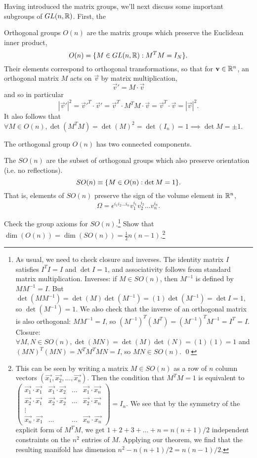 Having introduced the matrix groups, we'll next discuss some important subgroups of $GL(n,\mathbb{R})$. First, the 
\begin{defn}
Orthogonal groups $O(n)$ are the matrix groups which preserve the Euclidean inner product,
\begin{equation}
O(n)=\{M\in GL(n,\mathbb{R}): M^T M = I_N\}.
\end{equation}
Their elements correspond to orthogonal transformations, so that for $\boldsymbol{\mathbf{v}}\in \mathbb{R}^n$, an orthogonal matrix $M$ acts on $\vec{v}$ by matrix multiplication,
$$\vec{v}'=M\cdot \vec{v}$$
and so in particular
$$|\vec{v}'|^2={\vec{v}'}^T \cdot \vec{v}' = \vec{v}^T \cdot M^T M \cdot \vec{v}= \vec{v}^T \cdot \vec{v}=|\vec{v}|^2.$$
It also follows that $\forall M\in O(n), \det(M^TM)=\det(M)^2 = \det(I_n) = 1 \implies \det M =\pm 1$.
\end{defn}
The orthogonal group $O(n)$ has two connected components.
\begin{defn}
The  $SO(n)$ are the subset of orthogonal groups which also preserve orientation (i.e. no reflections).
$$SO(n)\equiv \{M\in O(n): \det M = 1\}.$$
That is, elements of $SO(n)$ preserve the sign of the volume element in $\mathbb{R}^n$,
$$\Omega= \epsilon^{i_1 i_2 \ldots i_n} v_1^{i_1}v_2^{i_2}\ldots v_n^{i_n}.$$
\end{defn}

\begin{ex}\label{groupaxiomsson}
Check the group axioms for $SO(n)$.\footnote{As usual, we need to check closure and inverses. The identity matrix $I$ satisfies $I^TI=I$ and $\det I=1$, and associativity follows from standard matrix multiplication. Inverses: if $M\in SO(n)$, then $M^{-1}$ is defined by $MM^{-1}=I$. But $\det(MM^{-1})=\det(M)\det(M^{-1})=(1)\det(M^{-1})=\det I = 1$, so $\det(M^{-1})=1$. We also check that the inverse of an orthogonal matrix is also orthogonal: $M M^{-1}=I$, so $(M^{-1})^T (M^T)= (M^{-1})^T M^{-1} =I^T = I$. Closure: $\forall M,N \in SO(n), \det(MN)=\det(M)\det(N)=(1)(1)=1$ and $(MN)^T(MN)=N^TM^T M N= I$, so $MN\in SO(n)$. \qed}
Show that $\dim(O(n))=\dim(SO(n))=\frac{1}{2} n(n-1)$.\footnote{This can be seen by writing a matrix $M\in SO(n)$ as a row of $n$ column vectors $(\vec{x_1},\vec{x_2},\ldots,\vec{x_n})$. Then the condition that $M^T M = 1$ is equivalent to
$\begin{pmatrix}
\vec{x_1}\cdot \vec{x_1} & \vec{x_1}\cdot \vec{x_2} & \ldots &\vec{x_1}\cdot \vec{x_n}\\
\vec{x_2}\cdot \vec{x_1} & \vec{x_2}\cdot \vec{x_2} & \ldots &\vec{x_2}\cdot \vec{x_n}\\
\vdots\\
\vec{x_n}\cdot \vec{x_1}& \ldots & \ldots & \vec{x_n} \cdot \vec{x_n}
\end{pmatrix}= I_n.$
We see that by the symmetry of the explicit form of $M^T M$, we get $1+2+3+\ldots+n = n(n+1)/2$ independent constraints on the $n^2$ entries of $M$. Applying our theorem, we find that the resulting manifold has dimension $n^2-n(n+1)/2=n(n-1)/2$.
} 
\end{ex}

